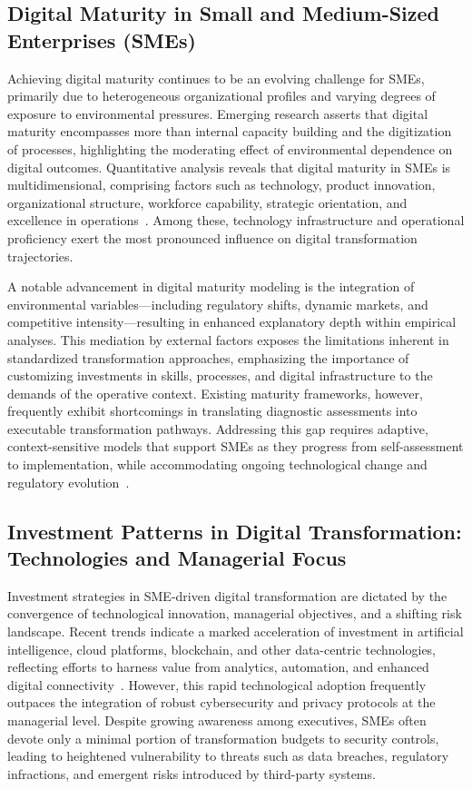\documentclass[sigconf]{acmart}
\begin{document}
\subsection{Digital Maturity in Small and Medium-Sized Enterprises (SMEs)}

Achieving digital maturity continues to be an evolving challenge for SMEs, primarily due to heterogeneous organizational profiles and varying degrees of exposure to environmental pressures. Emerging research asserts that digital maturity encompasses more than internal capacity building and the digitization of processes, highlighting the moderating effect of environmental dependence on digital outcomes. Quantitative analysis reveals that digital maturity in SMEs is multidimensional, comprising factors such as technology, product innovation, organizational structure, workforce capability, strategic orientation, and excellence in operations~\cite{ref34}. Among these, technology infrastructure and operational proficiency exert the most pronounced influence on digital transformation trajectories.

A notable advancement in digital maturity modeling is the integration of environmental variables—including regulatory shifts, dynamic markets, and competitive intensity—resulting in enhanced explanatory depth within empirical analyses. This mediation by external factors exposes the limitations inherent in standardized transformation approaches, emphasizing the importance of customizing investments in skills, processes, and digital infrastructure to the demands of the operative context. Existing maturity frameworks, however, frequently exhibit shortcomings in translating diagnostic assessments into executable transformation pathways. Addressing this gap requires adaptive, context-sensitive models that support SMEs as they progress from self-assessment to implementation, while accommodating ongoing technological change and regulatory evolution~\cite{ref34}.

\subsection{Investment Patterns in Digital Transformation: Technologies and Managerial Focus}

Investment strategies in SME-driven digital transformation are dictated by the convergence of technological innovation, managerial objectives, and a shifting risk landscape. Recent trends indicate a marked acceleration of investment in artificial intelligence, cloud platforms, blockchain, and other data-centric technologies, reflecting efforts to harness value from analytics, automation, and enhanced digital connectivity~\cite{ref35}. However, this rapid technological adoption frequently outpaces the integration of robust cybersecurity and privacy protocols at the managerial level. Despite growing awareness among executives, SMEs often devote only a minimal portion of transformation budgets to security controls, leading to heightened vulnerability to threats such as data breaches, regulatory infractions, and emergent risks introduced by third-party systems.
\end{document}
